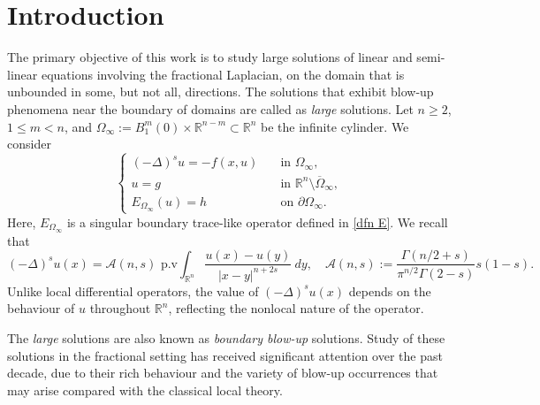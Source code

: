 \documentclass{amsart}
\newcommand{\R}{\mathbb{R}}
\newcommand{\slap}{(-\Delta)^{s}}
\newcommand{\rn}{\mathbb{R}^{n}}
\begin{document}
\section{Introduction}
The primary objective of this work is to study large solutions of linear and semi-linear equations involving the fractional Laplacian, on the domain that is unbounded in some, but not all, directions. The solutions that exhibit blow-up phenomena near the boundary of domains are called as \textit{large} solutions.
Let $n\geq 2$, $1\leq m<n$, and $\Omega_{\infty}:=B^{m}_{1}(0)\times \R^{n-m} \subset \R^{n}$ be the infinite cylinder. We consider
\begin{equation}\label{semi-linear prob on infinite cylinder}
    \begin{cases}
         \slap u=-f(x,u)\quad &\text{in } \Omega_{\infty},\\
         u=g &\text{in }\R^{n}\setminus\overline{\Omega}_{\infty}, \\
         E_{\Omega_{\infty}}(u)=h &\text{on }\partial\Omega_{\infty}.
    \end{cases}
 \end{equation}
Here,  $E_{\Omega_{\infty}}$ is a singular boundary trace-like operator defined in \eqref{dfn E}. %
We recall that 
\begin{equation*}
    \slap u(x)=\mathcal{A}(n,s) \text{ p.v} \int_{\R^{n}}\frac{u(x)-u(y)}{|x-y|^{n+2s}}\ dy,\quad \mathcal{A}(n,s):=\frac{\Gamma(n/2+s)}{\pi^{n/2}\Gamma(2-s)}s(1-s).
\end{equation*}
Unlike local differential operators, the value of $\slap u(x)$ depends on the behaviour of $u$ throughout $\rn$, reflecting the nonlocal nature of the operator.

The \textit{large} solutions are also known as \textit{boundary blow-up} solutions. Study of these solutions in the fractional setting has received significant attention over the past decade, due to their rich behaviour and the variety of blow-up occurrences that may arise compared with the classical local theory.
\end{document}
